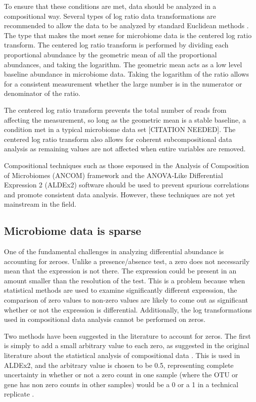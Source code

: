 To ensure that these conditions are met, data should be analyzed in a compositional way. Several types of log ratio data transformations are recommended to allow the data to be analyzed by standard Euclidean methods \cite{aitchison1982statistical}. The type that makes the most sense for microbiome data is the centered log ratio transform. The centered log ratio transform is performed by dividing each proportional abundance by the geometric mean of all the proportional abundances, and taking the logarithm. The geometric mean acts as a low level baseline abundance in microbiome data. Taking the logarithm of the ratio allows for a consistent measurement whether the large number is in the numerator or denominator of the ratio.

The centered log ratio transform prevents the total number of reads from affecting the measurement, so long as the geometric mean is a stable baseline, a condition met in a typical microbiome data set [CITATION NEEDED]. The centered log ratio transform also allows for coherent subcompositional data analysis as remaining values are not affected when entire variables are removed.

Compositional techniques such as those espoused in the Analysis of Composition of Microbiomes (ANCOM) framework \cite{mandal2015analysis} and the ANOVA-Like Differential Expression 2 (ALDEx2) software \cite{fernandes2014unifying} should be used to prevent spurious correlations and promote consistent data analysis. However, these techniques are not yet mainstream in the field.

\subsection{Microbiome data is sparse}
One of the fundamental challenges in analyzing differential abundance is accounting for zeroes. Unlike a presence/absence test, a zero does not necessarily mean that the expression is not there. The expression could be present in an amount smaller than the resolution of the test. This is a problem because when statistical methods are used to examine significantly different expression, the comparison of zero values to non-zero values are likely to come out as significant whether or not the expression is differential. Additionally, the log transformations used in compositional data analysis cannot be performed on zeros.

Two methods have been suggested in the literature to account for zeros. The first is simply to add a small arbitrary value to each zero, as suggested in the original literature about the statistical analysis of compositional data \cite{aitchison1982statistical}. This is used in ALDEx2, and the arbitrary value is chosen to be 0.5, representing complete uncertainty in whether or not a zero count in one sample (where the OTU or gene has non zero counts in other samples) would be a 0 or a 1 in a technical replicate \cite{fernandes2013anova}.

